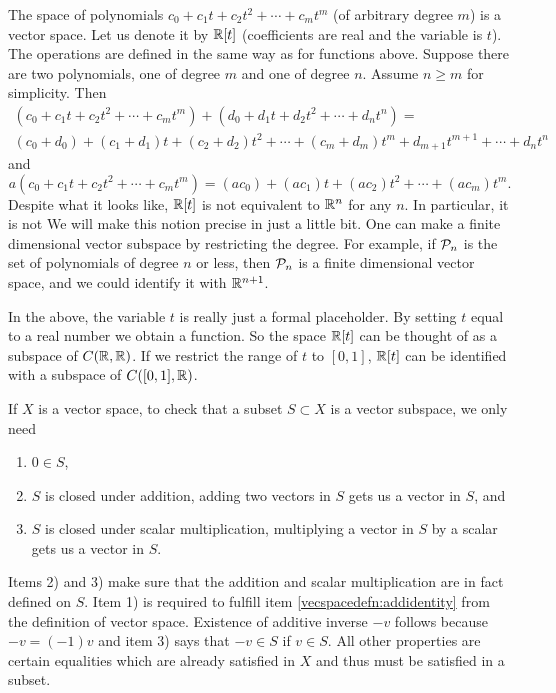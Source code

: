 \begin{example}
The space of polynomials $c_0 + c_1 t + c_2 t^2 + \cdots + c_m t^m$
(of arbitrary degree $m$) is a vector space.
Let us denote it by ${\mathbb{R}}[t]$ (coefficients are real and
the variable is $t$).  The operations are defined in the same way as for
functions above.
Suppose there are
two polynomials, one of degree $m$ and one of degree $n$.  Assume $n
\geq m$ for simplicity.  Then
\begin{multline*}
(c_0 + c_1 t + c_2 t^2 + \cdots + c_m t^m)
+
(d_0 + d_1 t + d_2 t^2 + \cdots + d_n t^n)
= \\
(c_0+d_0) + (c_1+d_1) t + (c_2 + d_2) t^2 + \cdots + (c_m+d_m) t^m
+ d_{m+1} t^{m+1} + \cdots + d_n t^n
\end{multline*}
and
\begin{equation*}
a(c_0 + c_1 t + c_2 t^2 + \cdots + c_m t^m)
=
(ac_0) + (ac_1) t + (ac_2) t^2 + \cdots + (ac_m) t^m  .
\end{equation*}
Despite what it looks like, ${\mathbb{R}}[t]$ is not equivalent to ${\mathbb{R}}^n$ for any $n$.  In
particular, it is not   We will make this notion
precise in just a little bit.  One can make a finite
dimensional vector subspace by restricting the degree.  For example,
if ${\mathcal{P}}_n$ is the set of polynomials of degree $n$ or less,
then ${\mathcal{P}}_n$ is a finite dimensional vector space, and we could 
identify it with ${\mathbb{R}}^{n+1}$.

In the above, the variable $t$ is really just a formal placeholder.
By setting $t$ equal to a real number we obtain a function.
So the space ${\mathbb{R}}[t]$ can be thought of as a subspace of $C({\mathbb{R}},{\mathbb{R}})$.
If we restrict the range of $t$ to $[0,1]$, ${\mathbb{R}}[t]$ can be identified with
a subspace of $C([0,1],{\mathbb{R}})$.
\end{example}

\begin{remark}
If $X$ is a vector space, to check that a subset $S \subset X$
is a vector subspace, we only need
\begin{enumerate}[1)]
\item
$0 \in S$,
\item
$S$ is closed under addition, adding two vectors in $S$ gets us a vector in
$S$, and
\item
$S$ is closed under scalar multiplication, multiplying a vector in
$S$ by a scalar gets us a vector in $S$.
\end{enumerate}
Items 2) and 3)
make sure that the addition and scalar multiplication are in fact defined on
$S$.  Item 1) is required
to fulfill item \ref{vecspacedefn:addidentity} from the definition of vector
space.  Existence
of additive inverse $-v$ follows because $-v = (-1)v$ and item 3) says that
$-v \in S$ if $v \in S$.  All other properties are certain equalities
which are already satisfied in $X$ and thus must be satisfied in a subset.
\end{remark}

